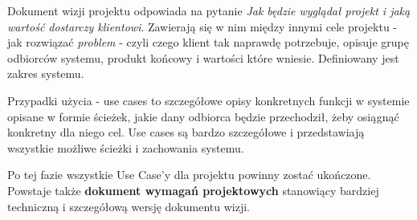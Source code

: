 \documentclass{article}
\begin{document}
Dokument wizji projektu odpowiada na pytanie \textit{Jak będzie wyglądał projekt i jaką wartość dostarczy klientowi}. Zawierają się w nim między innymi cele projektu - jak rozwiązać \textit{problem} - czyli czego klient tak naprawdę potrzebuje, opisuje grupę odbiorców systemu, produkt końcowy i wartości które wniesie. Definiowany jest zakres systemu.

Przypadki użycia - use cases to szczegółowe opisy konkretnych funkcji w systemie opisane w formie ścieżek, jakie dany odbiorca będzie przechodził, żeby osiągnąć konkretny dla niego cel. Use cases są bardzo szczegółowe i przedstawiają wszystkie możliwe ścieżki i zachowania systemu.

Po tej fazie wszystkie Use Case'y dla projektu powinny zostać ukończone. Powstaje także \textbf{dokument wymagań projektowych} stanowiący bardziej techniczną i szczegółową wersję dokumentu wizji.
\end{document}
